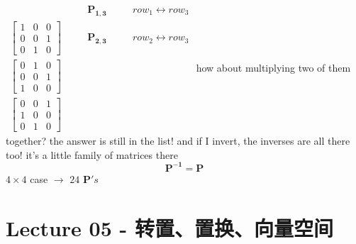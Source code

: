 \documentclass[12pt, a4paper]{article}
\begin{document}
{\begin{math}
\begin{aligned}
		& \quad & {\mathbf{P_{1,3}}} & \quad & row_1 \leftrightarrow row_3 \\
		\begin{bmatrix}
			1 & 0 & 0 \\
			0 & 0 & 1 \\
			0 & 1 & 0
		\end{bmatrix}
		& \quad & {\mathbf{P_{2,3}}} & \quad & row_2 \leftrightarrow row_3 \\
		\begin{bmatrix}
			0 & 1 & 0 \\
			0 & 0 & 1 \\
			1 & 0 & 0
		\end{bmatrix}
		& \quad & \  & \quad & \ \\
		\begin{bmatrix}
			0 & 0 & 1 \\
			1 & 0 & 0 \\
			0 & 1 & 0
		\end{bmatrix}
		& \quad & \  & \quad & \ 
	\end{aligned}
\end{math}
\vspace{14pt}
\newline
how about multiplying two of them together?
\newline
the answer is still in the list!
\newline
and if I invert, the inverses are all there too!
\newline
it's a little family of matrices there
\begin{displaymath}
	{\mathbf{P^{-1}}} = {\mathbf{P}}
\end{displaymath}
$4 \times 4$ case $\longrightarrow$ $24$ ${\mathbf{P}}'s$

\newpage
\section{Lecture 05 - 转置、置换、向量空间}
\pagestyle{fancy}
\lhead{}
\rhead{}

}
\end{document}
